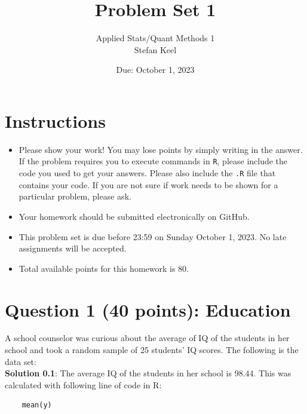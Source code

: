\documentclass[12pt,letterpaper]{article}
\title{Problem Set 1}
\date{Due: October 1, 2023}
\author{Applied Stats/Quant Methods 1\\Stefan Keel}
\begin{document}
	\maketitle
	
	\section*{Instructions}
	\begin{itemize}
	\item Please show your work! You may lose points by simply writing in the answer. If the problem requires you to execute commands in \texttt{R}, please include the code you used to get your answers. Please also include the \texttt{.R} file that contains your code. If you are not sure if work needs to be shown for a particular problem, please ask.
\item Your homework should be submitted electronically on GitHub.
\item This problem set is due before 23:59 on Sunday October 1, 2023. No late assignments will be accepted.
\item Total available points for this homework is 80.
	\end{itemize}
	
	\vspace{1cm}
	\section*{Question 1 (40 points): Education}

A school counselor was curious about the average of IQ of the students in her school and took a random sample of 25 students' IQ scores. The following is the data set:\\

  

\textbf{Solution 0.1}: The average IQ of the students in her school is 98.44. This was calculated with following line of code in R:
\begin{verbatim}
	mean(y)
	\end{verbatim}
\end{document}
